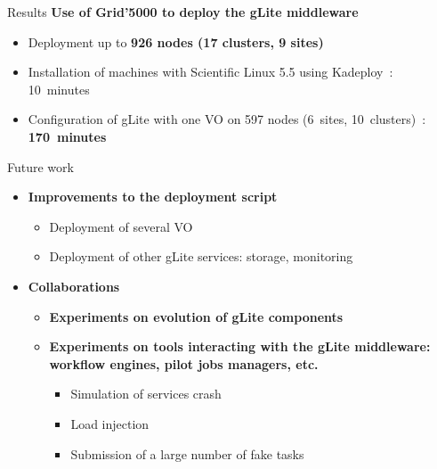 \documentclass[11pt,final,usepdftitle=false,handout]{beamer}
\begin{document}
\begin{frame}{Results}
	\textbf{Use of Grid'5000 to deploy the gLite middleware}
		\bigskip
\begin{itemize}
	\item Deployment up to \textbf{926 nodes (17 clusters, 9 sites)}
		\bigskip
\item Installation of machines with Scientific Linux 5.5 using Kadeploy~: 10~minutes
		\bigskip
\item Configuration of gLite with one VO on 597 nodes (6~sites, 10~clusters)~: \textbf{170~minutes}
\end{itemize}
	\end{frame}

	\begin{frame}{Future work}
	\begin{itemize}
		\item \textbf{Improvements to the deployment script}
		\begin{itemize}
		\item Deployment of several VO
		\item Deployment of other gLite services: storage, monitoring
		\bigskip
			\end{itemize}
		\item \textbf{Collaborations}
		\smallskip
			\begin{itemize}
				\item \textbf{Experiments on evolution of gLite components}
		\medskip
				\item \textbf{Experiments on tools interacting with the gLite middleware: workflow engines, pilot jobs managers, etc.}
					\begin{itemize}
						\item Simulation of services crash
						\item Load injection 
						\item Submission of a large number of fake tasks
					\end{itemize}
			\end{itemize}
	\end{itemize}
	\end{frame}
\end{document}

